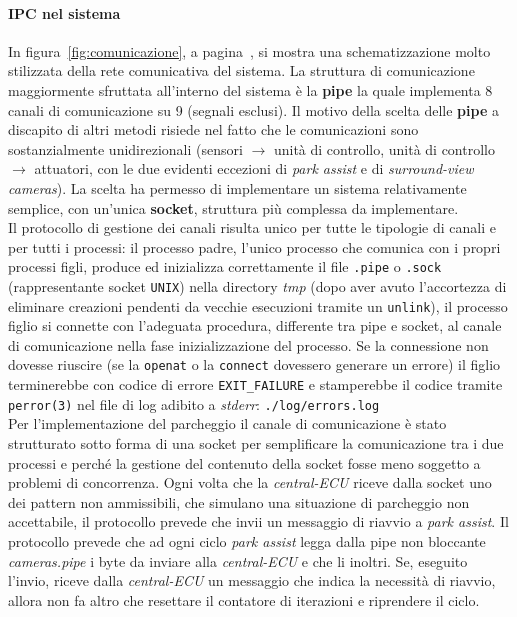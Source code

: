 \documentclass[11pt, openany]{article}
\theoremstyle{definition}
\theoremstyle{plain}
\theoremstyle{remark}
\begin{document}
		\paragraph{IPC nel sistema}
			In figura~\ref{fig:comunicazione}, a pagina~\pageref{fig:comunicazione}, si mostra una schematizzazione molto stilizzata della rete comunicativa del sistema.
			La struttura di comunicazione maggiormente sfruttata all'interno del sistema è la \textbf{pipe} la quale implementa 8 canali di comunicazione su 9 (segnali esclusi). Il motivo della scelta delle \textbf{pipe} a discapito di altri metodi risiede nel fatto che le comunicazioni sono sostanzialmente unidirezionali (sensori $\rightarrow$ unità di controllo, unità di controllo $\rightarrow$ attuatori, con le due evidenti eccezioni di \textit{park assist} e di \textit{surround-view cameras}). La scelta ha permesso di implementare un sistema relativamente semplice, con un'unica \textbf{socket}, struttura più complessa da implementare.\\
			Il protocollo di gestione dei canali risulta unico per tutte le tipologie di canali e per tutti i processi: il processo padre, l'unico processo che comunica con i propri processi figli, produce ed inizializza correttamente il file \texttt{.pipe} o \texttt{.sock} (rappresentante socket \texttt{UNIX}) nella directory \textit{tmp} (dopo aver avuto l'accortezza di eliminare creazioni pendenti da vecchie esecuzioni tramite un \texttt{unlink}), il processo figlio si connette con  l'adeguata procedura, differente tra pipe e socket, al canale di comunicazione nella fase inizializzazione del processo. Se la connessione non dovesse riuscire (se la \texttt{openat} o la \texttt{connect} dovessero generare un errore) il figlio terminerebbe con codice di errore \texttt{EXIT\_FAILURE} e stamperebbe il codice tramite \texttt{perror(3)} nel file di log adibito a \textit{stderr}: \texttt{./log/errors.log}\\
			Per l'implementazione del parcheggio il canale di comunicazione è stato strutturato sotto forma di una socket per semplificare la comunicazione tra i due processi e perché la gestione del contenuto della socket fosse meno soggetto a problemi di concorrenza. Ogni volta che la \textit{central-ECU} riceve dalla socket uno dei pattern non ammissibili, che simulano una situazione di parcheggio non accettabile, il protocollo prevede che invii un messaggio di riavvio a \textit{park assist}. Il protocollo prevede che ad ogni ciclo \textit{park assist} legga dalla pipe non bloccante \textit{cameras.pipe} i byte da inviare alla \textit{central-ECU} e che li inoltri. Se, eseguito l'invio, riceve dalla \textit{central-ECU} un messaggio che indica la necessità di riavvio, allora non fa altro che resettare il contatore di iterazioni e riprendere il ciclo.
\end{document}
